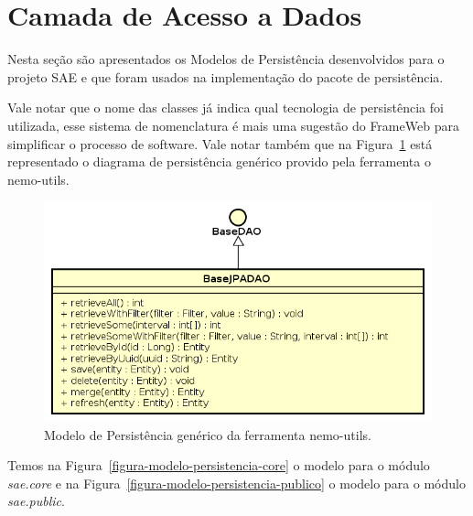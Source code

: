 \newpage




\section{Camada de Acesso a Dados}

Nesta seção são apresentados os Modelos de Persistência desenvolvidos para o projeto SAE e que foram usados na implementação do pacote de persistência.


Vale notar que o nome das classes já indica qual tecnologia de persistência foi utilizada, esse sistema de nomenclatura é mais uma sugestão do FrameWeb para simplificar o processo de software. Vale notar também que na Figura~\ref{figura-modelo-persistencia-generico} está representado o diagrama de persistência genérico provido pela ferramenta o nemo-utils. 




\begin{figure}[!h]
  \centering
  \includegraphics[scale=0.45]{figuras/baseJPADAO.png}
  \caption{Modelo de Persistência genérico da ferramenta nemo-utils.}
  \label{figura-modelo-persistencia-generico}
\end{figure}



Temos na Figura~\ref{figura-modelo-persistencia-core}  o modelo para o módulo \textit{sae.core} e na Figura~\ref{figura-modelo-persistencia-publico} o modelo para o módulo \textit{sae.public}.


